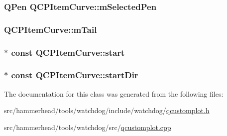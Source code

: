 \subsubsection[{\texorpdfstring{m\+Selected\+Pen}{mSelectedPen}}]{\setlength{\rightskip}{0pt plus 5cm}Q\+Pen Q\+C\+P\+Item\+Curve\+::m\+Selected\+Pen\hspace{0.3cm}{\ttfamily [protected]}}\hypertarget{classQCPItemCurve_ab22cbab261b20be5aa8e4ca252149246}{}\label{classQCPItemCurve_ab22cbab261b20be5aa8e4ca252149246}
\subsubsection[{\texorpdfstring{m\+Tail}{mTail}}]{ Q\+C\+P\+Item\+Curve\+::m\+Tail\hspace{0.3cm}{\ttfamily [protected]}}\hypertarget{classQCPItemCurve_af1dca285b97e3f5b892dab827a79f327}{}\label{classQCPItemCurve_af1dca285b97e3f5b892dab827a79f327}
\subsubsection[{\texorpdfstring{start}{start}}]{$\ast$ const Q\+C\+P\+Item\+Curve\+::start}\hypertarget{classQCPItemCurve_a20c3b5ea31c33764f4f30c2ec7ae518b}{}\label{classQCPItemCurve_a20c3b5ea31c33764f4f30c2ec7ae518b}
\subsubsection[{\texorpdfstring{start\+Dir}{startDir}}]{$\ast$ const Q\+C\+P\+Item\+Curve\+::start\+Dir}\hypertarget{classQCPItemCurve_aa124bf66c09cc51c627fb49db8bf8a7b}{}\label{classQCPItemCurve_aa124bf66c09cc51c627fb49db8bf8a7b}


The documentation for this class was generated from the following files\+:\begin{DoxyCompactItemize}
\item 
src/hammerhead/tools/watchdog/include/watchdog/\hyperlink{qcustomplot_8h}{qcustomplot.\+h}\item 
src/hammerhead/tools/watchdog/src/\hyperlink{qcustomplot_8cpp}{qcustomplot.\+cpp}\end{DoxyCompactItemize}
